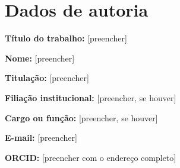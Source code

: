 \documentclass[12pt,a4paper]{article}
\begin{document}
\section*{Dados de autoria}
\textbf{Título do trabalho:} [preencher]

\textbf{Nome:} [preencher]

\textbf{Titulação:} [preencher]

\textbf{Filiação institucional:} [preencher, se houver]

\textbf{Cargo ou função:} [preencher, se houver]

\textbf{E-mail:} [preencher]

\textbf{ORCID:} [preencher com o endereço completo]
\end{document}
